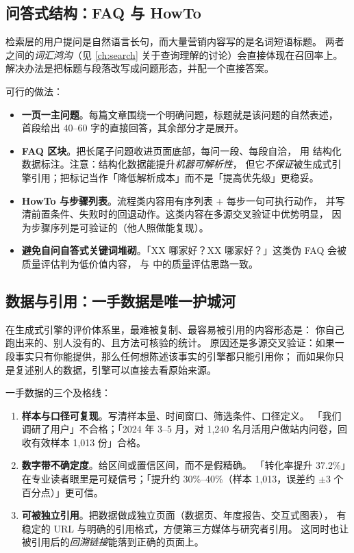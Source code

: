\subsection{问答式结构：FAQ 与 HowTo}

检索层的用户提问是自然语言长句，而大量营销内容写的是名词短语标题。
两者之间的\emph{词汇鸿沟}（见 \cref{ch:search} 关于查询理解的讨论）会直接体现在召回率上。
解决办法是把标题与段落改写成问题形态，并配一个直接答案。

可行的做法：

\begin{itemize}
  \item \textbf{一页一主问题}。每篇文章围绕一个明确问题，标题就是该问题的自然表述，
        首段给出 40--60 字的直接回答，其余部分才是展开。
  \item \textbf{FAQ 区块}。把长尾子问题收进页面底部，每问一段、每段自洽，
        用  结构化数据标注。注意：结构化数据能提升\emph{机器可解析性}，
        但它\emph{不保证}被生成式引擎引用；把标记当作「降低解析成本」而不是「提高优先级」更稳妥。
  \item \textbf{HowTo 与步骤列表}。流程类内容用有序列表 + 每步一句可执行动作，
        并写清前置条件、失败时的回退动作。这类内容在多源交叉验证中优势明显，
        因为步骤序列是可验证的（他人照做能复现）。
  \item \textbf{避免自问自答式关键词堆砌}。「XX 哪家好？XX 哪家好？」这类伪 FAQ 会被质量评估判为低价值内容，
        与 \cite{google2024quality} 中的质量评估思路一致。
\end{itemize}

\subsection{数据与引用：一手数据是唯一护城河}

在生成式引擎的评价体系里，最难被复制、最容易被引用的内容形态是：
你自己跑出来的、别人没有的、且方法可核验的统计。
原因还是多源交叉验证：如果一段事实只有你能提供，那么任何想陈述该事实的引擎都只能引用你；
而如果你只是复述别人的数据，引擎可以直接去看原始来源。

一手数据的三个及格线：

\begin{enumerate}
  \item \textbf{样本与口径可复现}。写清样本量、时间窗口、筛选条件、口径定义。
        「我们调研了用户」不合格；「2024 年 3--5 月，对 1,240 名月活用户做站内问卷，回收有效样本 1,013 份」合格。
  \item \textbf{数字带不确定度}。给区间或置信区间，而不是假精确。
        「转化率提升 37.2\%」在专业读者眼里是可疑信号；「提升约 30\%--40\%（样本 1,013，误差约 $\pm 3$ 个百分点）」更可信。
  \item \textbf{可被独立引用}。把数据做成独立页面（数据页、年度报告、交互式图表），
        有稳定的 URL 与明确的引用格式，方便第三方媒体与研究者引用。
        这同时也让被引用后的\emph{回溯链接}能落到正确的页面上。
\end{enumerate}

